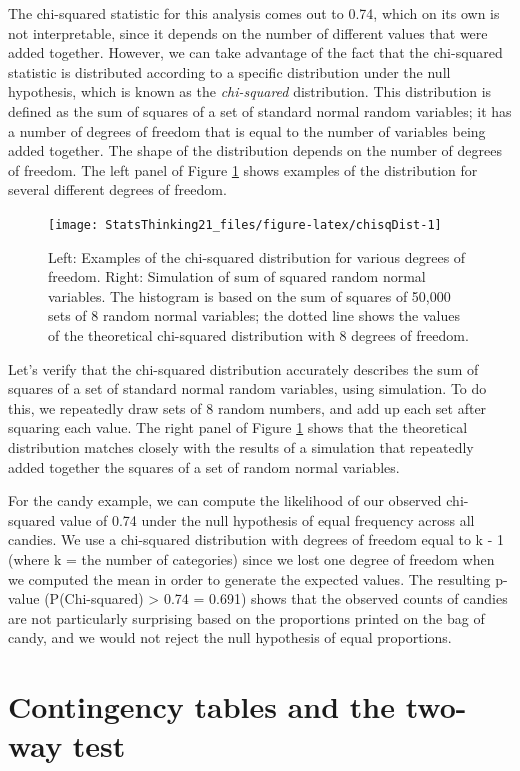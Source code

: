 \documentclass[
  12pt,
]{book}
\begin{document}
The chi-squared statistic for this analysis comes out to 0.74, which on its own is not interpretable, since it depends on the number of different values that were added together. However, we can take advantage of the fact that the chi-squared statistic is distributed according to a specific distribution under the null hypothesis, which is known as the \emph{chi-squared} distribution. This distribution is defined as the sum of squares of a set of standard normal random variables; it has a number of degrees of freedom that is equal to the number of variables being added together. The shape of the distribution depends on the number of degrees of freedom. The left panel of Figure \ref{fig:chisqDist} shows examples of the distribution for several different degrees of freedom.

\begin{figure}
\texttt{[image: StatsThinking21\_files/figure-latex/chisqDist-1]} \caption{Left: Examples of the chi-squared distribution for various degrees of freedom.  Right: Simulation of sum of squared random normal variables.   The histogram is based on the sum of squares of 50,000 sets of 8 random normal variables; the dotted line shows the values of the theoretical chi-squared distribution with 8 degrees of freedom.}\label{fig:chisqDist}
\end{figure}

Let's verify that the chi-squared distribution accurately describes the sum of squares of a set of standard normal random variables, using simulation. To do this, we repeatedly draw sets of 8 random numbers, and add up each set after squaring each value. The right panel of Figure \ref{fig:chisqDist} shows that the theoretical distribution matches closely with the results of a simulation that repeatedly added together the squares of a set of random normal variables.

For the candy example, we can compute the likelihood of our observed chi-squared value of 0.74 under the null hypothesis of equal frequency across all candies. We use a chi-squared distribution with degrees of freedom equal to k - 1 (where k = the number of categories) since we lost one degree of freedom when we computed the mean in order to generate the expected values. The resulting p-value (P(Chi-squared) \textgreater{} 0.74 = 0.691) shows that the observed counts of candies are not particularly surprising based on the proportions printed on the bag of candy, and we would not reject the null hypothesis of equal proportions.

\hypertarget{two-way-test}{%
\section{Contingency tables and the two-way test}\label{two-way-test}}
\end{document}
